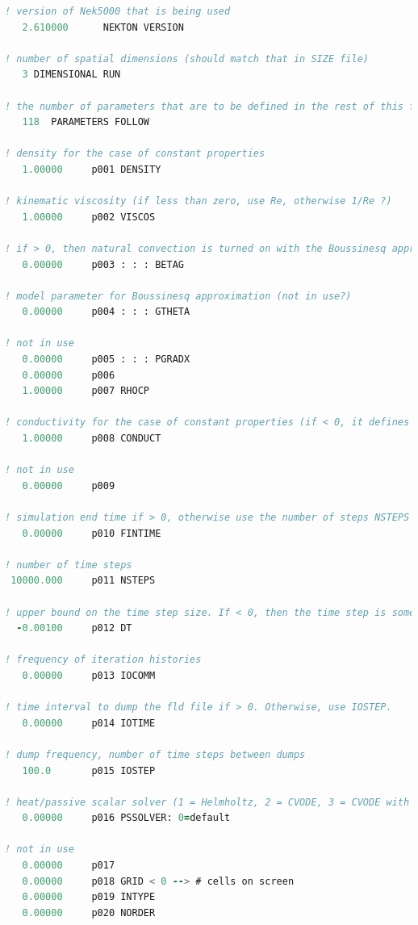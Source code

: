 \documentclass[10pt]{article}
\numberwithin{equation}{section} %
\begin{document}
\begin{itemize}
\begin{lstlisting}[language=Fortran]
! version of Nek5000 that is being used
   2.610000      NEKTON VERSION
 
! number of spatial dimensions (should match that in SIZE file)
   3 DIMENSIONAL RUN
 
! the number of parameters that are to be defined in the rest of this file. In order to read these correctly, you cannot have any blank lines, since this determines how many lines to read. For commenting purposes, this is ignored here.
   118  PARAMETERS FOLLOW
   
! density for the case of constant properties
   1.00000     p001 DENSITY

! kinematic viscosity (if less than zero, use Re, otherwise 1/Re ?)
   1.00000     p002 VISCOS

! if > 0, then natural convection is turned on with the Boussinesq approximation (not in use?)
   0.00000     p003 : : : BETAG
   
! model parameter for Boussinesq approximation (not in use?)
   0.00000     p004 : : : GTHETA
   
! not in use
   0.00000     p005 : : : PGRADX
   0.00000     p006
   1.00000     p007 RHOCP
   
! conductivity for the case of constant properties (if < 0, it defines the Peclet number)
   1.00000     p008 CONDUCT
   
! not in use
   0.00000     p009
   
! simulation end time if > 0, otherwise use the number of steps NSTEPS
   0.00000     p010 FINTIME

! number of time steps
 10000.000     p011 NSTEPS
 
! upper bound on the time step size. If < 0, then the time step is some multiple of the number of time steps.
  -0.00100     p012 DT
  
! frequency of iteration histories
   0.00000     p013 IOCOMM
   
! time interval to dump the fld file if > 0. Otherwise, use IOSTEP. 
   0.00000     p014 IOTIME

! dump frequency, number of time steps between dumps
   100.0       p015 IOSTEP
   
! heat/passive scalar solver (1 = Helmholtz, 2 = CVODE, 3 = CVODE with user-supplied Jacobian. A negative number sets source terms to zero).
   0.00000     p016 PSSOLVER: 0=default

! not in use
   0.00000     p017
   0.00000     p018 GRID < 0 --> # cells on screen
   0.00000     p019 INTYPE
   0.00000     p020 NORDER


\end{lstlisting}
\end{itemize}
\end{document}
